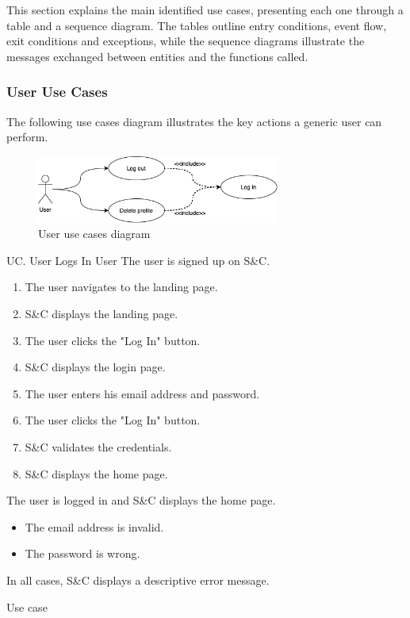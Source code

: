 This section explains the main identified use cases, presenting each one through a table and a sequence diagram.
The tables outline entry conditions, event flow, exit conditions and exceptions, while the sequence diagrams illustrate the messages exchanged between entities and the functions called.

\setcounter{uc}{1}

\subsubsection{User Use Cases}
The following use cases diagram illustrates the key actions a generic user can perform.

\begin{figure}[h]
    \centering
    \includegraphics[width=8cm]{images/use-cases-diagrams/user.png}
    \caption{User use cases diagram}
\end{figure}

\clearpage
\begin{usecase}
    {UC\theuc. User Logs In}
    {User}
    {The user is signed up on S\&C.}
    {\begin{enumerate}[leftmargin=*]
        \item The user navigates to the landing page.
        \item S\&C displays the landing page.
        \item The user clicks the "Log In" button.
        \item S\&C displays the login page.
        \item The user enters his email address and password.
        \item The user clicks the "Log In" button.
        \item S\&C validates the credentials.
        \item S\&C displays the home page.
    \end{enumerate}}
    {The user is logged in and S\&C displays the home page.}
    {\begin{itemize}[leftmargin=*, label=\tiny\textbullet]
        \item The email address is invalid.
        \item The password is wrong.
        \end{itemize}
        In all cases, S\&C displays a descriptive error message.}
    {Use case \theuc}
\end{usecase}

